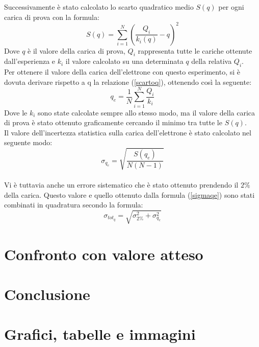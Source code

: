 \documentclass{article}
\begin{document}
Successivamente è stato calcolato lo scarto quadratico medio $S(q)$ per ogni carica di prova con la formula:
\begin{equation}
	S(q)=\sum_{i=1}^N\left(\frac{Q_i}{k_i(q)}-q\right)^2
	\label{scartoq}
\end{equation}
Dove $q$ è il valore della carica di prova, $Q_i$ rappresenta tutte le cariche ottenute dall'esperienza e $k_i$ il valore calcolato su una determinata $q$ della relativa $Q_i$.\\

Per ottenere il valore della carica dell'elettrone con questo esperimento, si è dovuta derivare rispetto a q la relazione (\ref{scartoq}), ottenendo così la seguente:
\begin{equation}
	q_e=\frac 1N\sum^N_{i=1}\frac{Q_i}{k_i}
\end{equation}
Dove le $k_i$ sono state calcolate sempre allo stesso modo, ma il valore della carica di prova è stato ottenuto graficamente cercando il minimo tra tutte le $S(q)$.\\

Il valore dell'incertezza statistica sulla carica dell'elettrone è stato calcolato nel seguente modo:
\begin{equation}
	\sigma_{q_e}=\sqrt{\frac{S(q_e)}{N(N-1)}}
	\label{sigmaqe}
\end{equation}\\

Vi è tuttavia anche un errore sistematico che è stato ottenuto prendendo il $2\%$ della carica. Questo valore e quello ottenuto dalla formula (\ref{sigmaqe}) sono stati combinati in quadratura secondo la formula:
\begin{equation}
	\sigma_{tot_q}=\sqrt{\sigma_{2\%}^2+\sigma_{q_e}^2}
\end{equation}

\section{Confronto con valore atteso}

\section{Conclusione}

\section{Grafici, tabelle e immagini}
\end{document}
